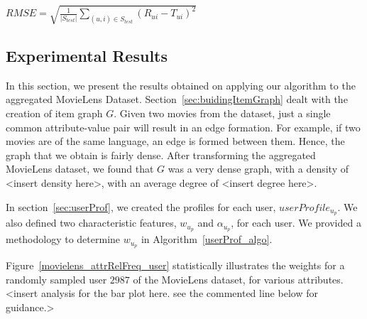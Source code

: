 \documentclass{acm_proc_article-sp}
\begin{document}
$RMSE = \sqrt{\frac{1}{|S_{test}|} \sum_{(u,i) \in S_{test}} (R_{ui} - T_{ui})^2}$

\subsection{Experimental Results}
In this section, we present the results obtained on applying our algorithm to the aggregated MovieLens Dataset. Section~\ref{sec:buidingItemGraph} dealt with the creation of item graph $G$. Given two movies from the dataset, just a single common attribute-value pair will result in an edge formation. For example, if two movies are of the same language, an edge is formed between them. Hence, the graph that we obtain is fairly dense. After transforming the aggregated MovieLens dataset, we found that $G$ was a very dense graph, with a density of <insert density here>, with an average degree of <insert degree here>.

% 

In section~\ref{sec:userProf}, we created the profiles for each user, $userProfile_{u_p}$. We also defined two characteristic features, $w_{u_p}$ and $\alpha_{u_p}$, for each user. We provided a methodology to determine $w_{u_p}$ in Algorithm~\ref{userProf_algo}.

Figure~\ref{movielens_attrRelFreq_user} statistically illustrates the weights for a randomly sampled user $2987$ of the MovieLens dataset, for various attributes. <insert analysis for the bar plot here. see the commented line below for guidance.>
\end{document}
